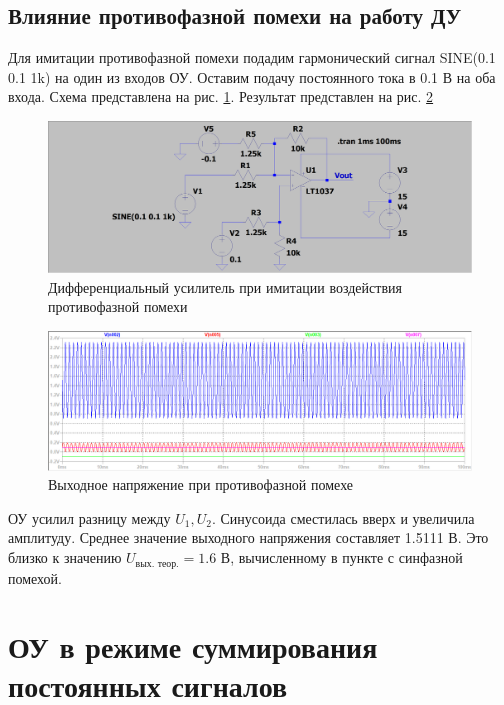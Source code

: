 \documentclass[a4paper, 12pt]{article}
\begin{document}
    \subsection{Влияние противофазной помехи на работу ДУ}
    Для имитации противофазной помехи подадим гармонический сигнал SINE(0.1 0.1 1k) на один из входов ОУ.
    Оставим подачу постоянного тока в 0.1 В на оба входа. Схема представлена на рис. \ref{fig:scheme3}. Результат представлен на рис. \ref{fig:1task_sine1}
    \begin{figure}[H]
        \centering
        \includegraphics[scale=0.22]{scheme3.png}
        \captionsetup{skip=0pt}
        \caption{Дифференциальный усилитель при имитации воздействия противофазной помехи}
        \label{fig:scheme3}
    \end{figure}
    \begin{figure}[H]
        \centering
        \includegraphics[scale=0.46]{1task_sine1.png}
        \captionsetup{skip=0pt}
        \caption{Выходное напряжение при противофазной помехе}
        \label{fig:1task_sine1}
    \end{figure}
    \noindent ОУ усилил разницу между $U_1,U_2$. Синусоида сместилась вверх и увеличила амплитуду. Среднее значение 
    выходного напряжения составляет 1.5111 В. Это близко к значению $U_{\text{вых. теор.}}=1.6$ В, вычисленному в пункте с синфазной помехой.


    \section{ОУ в режиме суммирования постоянных сигналов}
\end{document}
